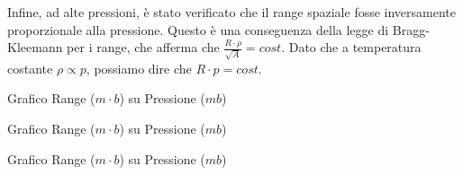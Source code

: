 Infine, ad alte pressioni, è stato verificato che il range spaziale fosse inversamente proporzionale alla pressione. 
Questo è una conseguenza della legge di Bragg-Kleemann per i range, che afferma che $\frac{R\cdot\rho}{\sqrt{A}}=cost$. Dato che a temperatura costante $\rho\propto p$, possiamo dire che $R\cdot p=cost$.

\begin{grafico}
 \centering
 \resizebox{\textwidth}{!}{%
 
 }%
 \caption{Grafico Range ($m \cdot b$) su Pressione ($mb$)} 
 \label{gr:rp1.tex} 
\end{grafico}


\begin{grafico}
 \centering
 \resizebox{\textwidth}{!}{%
 
 }%
 \caption{Grafico Range ($m \cdot b$) su Pressione ($mb$)} 
 \label{gr:rp2.tex} 
\end{grafico}


\begin{grafico}
 \centering
 \resizebox{\textwidth}{!}{%
 
 }%
 \caption{Grafico Range ($m \cdot b$) su Pressione ($mb$)} 
 \label{gr:rp3.tex} 
\end{grafico}